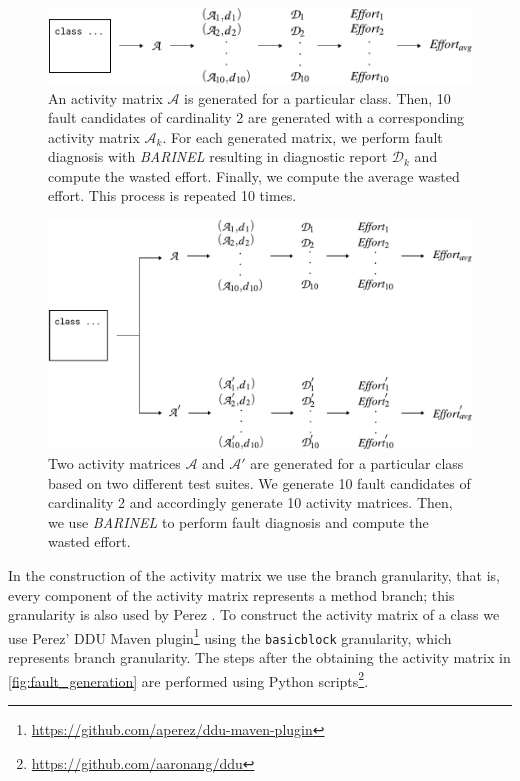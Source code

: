 \documentclass[twoside,a4paper,11pt]{memoir}
\begin{document}
\begin{figure}
  \includegraphics[width=\linewidth]{figures/fault_generation}
  \caption{An activity matrix $\mathcal{A}$ is generated for a particular class. Then, 10 fault candidates of cardinality 2 are generated with a corresponding activity matrix $\mathcal{A}_k$. For each generated matrix, we perform fault diagnosis with \emph{BARINEL} resulting in diagnostic report $\mathcal{D}_k$ and compute the wasted effort. Finally, we compute the average wasted effort. This process is repeated 10 times.}
  \label{fig:fault_generation}
\end{figure}

\begin{figure}
  \includegraphics[width=\linewidth]{figures/fault_generation_delta}
  \caption{Two activity matrices $\mathcal{A}$ and $\mathcal{A}'$ are generated for a particular class based on two different test suites. We generate 10 fault candidates of cardinality 2 and accordingly generate 10 activity matrices. Then, we use \emph{BARINEL} to perform fault diagnosis and compute the wasted effort.}
  \label{fig:fault_generation_delta}
\end{figure}

In the construction of the activity matrix we use the branch granularity, that is, every component of the activity matrix represents a method branch; this granularity is also used by Perez \etal \cite{DBLP:conf/icse/PerezAD17}.
To construct the activity matrix of a class we use Perez' DDU Maven plugin\footnote{\url{https://github.com/aperez/ddu-maven-plugin}} using the \texttt{basicblock} granularity, which represents branch granularity.
The steps after the obtaining the activity matrix in \autoref{fig:fault_generation} are performed using Python scripts\footnote{\url{https://github.com/aaronang/ddu}}.
\end{document}
